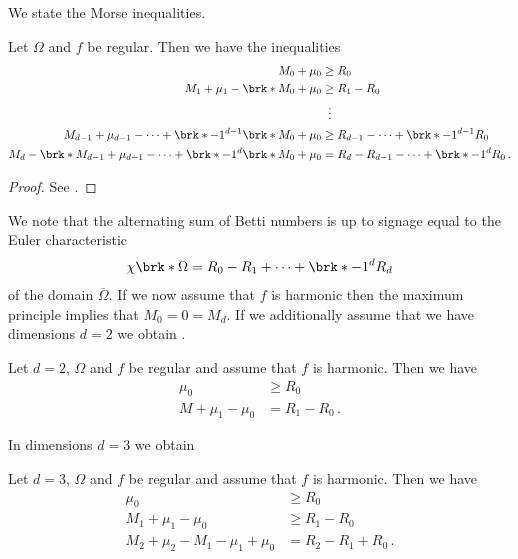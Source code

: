We state the Morse inequalities.
\begin{theorem}
Let $\Omega$ and $f$ be regular. Then we have the inequalities
\begin{align*}
  M_0+\mu_0&\geq R_0\\
  M_1+\mu_1-\brk*{M_0+\mu_0}&\geq R_1-R_0 \\
  &\;\;\vdots \\
  M_{d-1}+\mu_{d-1}-\dots+\brk*{-1}^{d-1}\brk*{M_0+\mu_0}&\geq R_{d-1}-\dots +\brk*{-1}^{d-1}R_0 \\
  M_{d}-\brk*{M_{d-1}+\mu_{d-1}}-\dots+\brk*{-1}^{d}\brk*{M_0+\mu_0}&=R_{d}-R_{d-1}-\dots +\brk*{-1}^{d}R_0\,.
\end{align*}
\end{theorem}
\begin{proof}
  See \cite[Theorem 10.2']{Morse1969}.
\end{proof}
We note that the alternating sum of Betti numbers
is up to signage equal to the Euler characteristic
\begin{align*}
  \chi\brk*{\Omega}=R_0-R_1+\dots+\brk*{-1}^{d}R_d
\end{align*}
of the domain $\overline{\Omega}$.
If we now assume that $f$ is harmonic then the maximum principle implies that
$M_0=0=M_d$. 
If we additionally assume that we have dimensions $d=2$ we obtain \cite[Corollary 10.1]{Morse1969}.
\begin{corollary}[Morse inequalities for $f$ harmonic, $d=2$]
  Let $d=2$, $\Omega$ and $f$ be regular and assume that $f$ is harmonic. Then we have
  \begin{align*}
    \mu_0&\geq R_0 \\
    M+\mu_1-\mu_0&=R_1-R_0\,.
  \end{align*}
\end{corollary}
In dimensions $d=3$ we obtain \cite[Corollary 10.2]{Morse1969}
\begin{corollary}[Morse inequalities for $f$ harmonic, $d=3$]
  Let $d=3$, $\Omega$ and $f$ be regular and assume that $f$ is harmonic. Then we have
  \begin{align*}
    \mu_0&\geq R_0 \\
    M_1+\mu_1-\mu_0&\geq R_1-R_0 \\
    M_2+\mu_2-M_1-\mu_1+\mu_0&= R_2-R_1+R_0\,.
  \end{align*}
\end{corollary}

